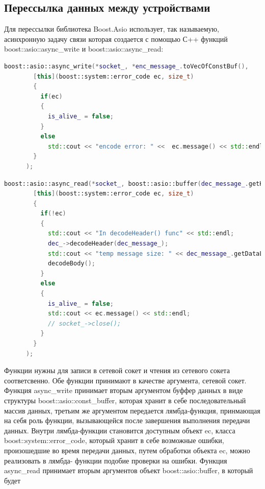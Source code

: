 \documentclass[a4paper, 14pt]{extreport}
\begin{document}
\subsection{Перессылка данных между устройствами}
Для перессылки библиотека Boost.Asio использует, так называемую, асинхронную задачу связи которая создается с помощью С++ функций
boost::asio::async\_write и boost::asio::async\_read:
\begin{lstlisting}[language=C++, frame=single, xleftmargin=15pt, caption={Вызов функции async\_write},label=DescriptiveLabel]
        boost::asio::async_write(*socket_, *enc_message_.toVecOfConstBuf(),
        [this](boost::system::error_code ec, size_t)
        {
          if(ec)
          {
            is_alive_ = false;
          }
          else
            std::cout << "encode error: " <<  ec.message() << std::endl;
        }
      );
\end{lstlisting}
\begin{lstlisting}[language=C++, frame=single, xleftmargin=15pt, caption={Вызов функции async\_read},label=DescriptiveLabel]
        boost::asio::async_read(*socket_, boost::asio::buffer(dec_message_.getHead(), SerializedMessage::HeaderLength),
        [this](boost::system::error_code ec, size_t)
        {
          if(!ec)
          {
            std::cout << "In decodeHeader() func" << std::endl;
            dec_->decodeHeader(dec_message_);
            std::cout << "temp message size: " << dec_message_.getDataLength() << std::endl;
            decodeBody();
          }
          else
          {
            is_alive_ = false;
            std::cout << ec.message() << std::endl;
            // socket_->close();
          }
        }
      );
\end{lstlisting}
\par Функции нужны для записи в сетевой сокет и чтения из сетевого сокета соответсвенно. Обе функции принимают в качестве аргумента,
сетевой сокет. Функция async\_write принимает вторым аргументом буффер данных в виде структуры boost::asio::const\_buffer, которая хранит
в себе последовательный массив данных, третьим же аргументом передается лямбда-функция, принмающая на себя роль функции, вызывающейся 
после завершения выполнения передачи данных. Внутри лямбда-функции становится доступным объект ec, класса boost::system::error\_code, 
который хранит в себе возможные ошибки, произошедшие во время передачи данных, путем обработки объекта ec, можно реализовать в лямбда-
функции подобие проверки на ошибки. Функция async\_read принимает вторым аргументов объект boost::asio::buffer, в который будет 
\end{document}
